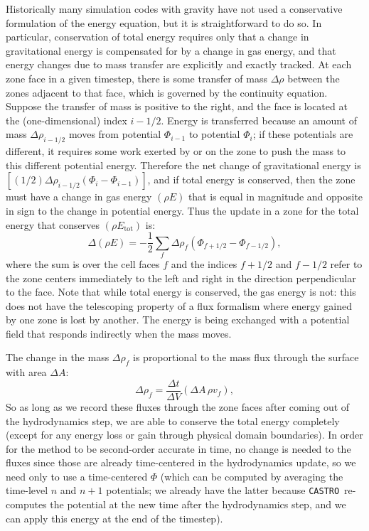 \documentclass[iop]{../emulateapj}
\newcommand{\castro}{\texttt{CASTRO}}
\begin{document}
Historically many simulation codes with gravity have not used a conservative formulation 
of the energy equation, but it is straightforward to do so. In particular, conservation of 
total energy requires only that a change in gravitational energy is compensated for by a 
change in gas energy, and that energy changes due to mass transfer are explicitly and 
exactly tracked. At each zone face in a given timestep, there is some transfer of mass $\Delta \rho$ between 
the zones adjacent to that face, which is governed by the continuity equation. Suppose the 
transfer of mass is positive to the right, and the face is located at the (one-dimensional)
index $i-1/2$. Energy is transferred because an amount of mass $\Delta \rho_{i-1/2}$ moves from 
potential $\Phi_{i-1}$ to potential $\Phi_{i}$; if these potentials are different, it requires some 
work exerted by or on the zone to push the mass to this different potential energy. Therefore 
the net change of gravitational energy is $\left[(1/2)\Delta \rho_{i-1/2} (\Phi_{i} - \Phi_{i-1})\right]$,
and if total energy is conserved, then the zone must have a change in gas energy 
$(\rho E)$ that is equal in magnitude and opposite in sign to the change in potential energy. 
Thus the update in a zone for the total energy that conserves $(\rho E_{\text{tot}})$ is:
\begin{equation}
  \Delta (\rho E) = -\frac{1}{2}\sum_{f} \Delta \rho_{f} (\Phi_{f+1/2} - \Phi_{f-1/2}),\label{eq:grav_energy_conservation_update}
\end{equation}
where the sum is over the cell faces $f$ and the indices $f+1/2$ and $f-1/2$ refer to 
the zone centers immediately to the left and right in the direction perpendicular to the face.
Note that while total energy is conserved, the gas energy is not: this does not have the 
telescoping property of a flux formalism where energy gained by one zone is lost by another. 
The energy is being exchanged with a potential field that responds indirectly when the mass moves.

The change in the mass $\Delta \rho_{f}$ is proportional to the mass flux through the surface with area $\Delta A$:
\begin{equation}
  \Delta \rho_f = \frac{\Delta t}{\Delta V} (\Delta A\, \rho v_{f}),\label{eq:mass_transfer}
\end{equation}
So as long as we record these fluxes through the zone faces after coming out of the hydrodynamics step, 
we are able to conserve the total energy completely (except for any energy loss or gain through 
physical domain boundaries). In order for the method to be second-order accurate in time, 
no change is needed to the fluxes since those are already time-centered 
in the hydrodynamics update, so we need only to use a time-centered $\Phi$ (which can be computed 
by averaging the time-level $n$ and $n+1$ potentials; we already have the latter because \castro\ 
re-computes the potential at the new time after the hydrodynamics step, and we can apply this energy 
at the end of the timestep).
\end{document}
